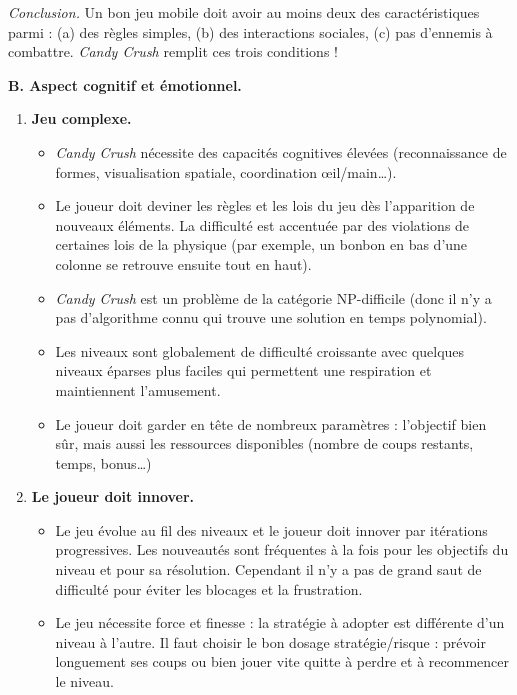 \documentclass[11pt,class=report,crop=false]{standalone}
\begin{document}
\emph{Conclusion.} 
Un bon jeu mobile doit avoir au moins deux des caractéristiques parmi : 
(a) des règles simples,
(b) des interactions sociales,
(c) pas d'ennemis à combattre.
\emph{Candy Crush} remplit ces trois conditions !

 
\bigskip

\textbf{B. Aspect cognitif et émotionnel.}

\begin{enumerate}
	\item \textbf{Jeu complexe.}	
	\begin{itemize}
		\item \emph{Candy Crush} nécessite des capacités cognitives élevées (reconnaissance de formes, visualisation spatiale, coordination \oe il/main\ldots). 
			
		\item Le joueur doit deviner les règles et les lois du jeu dès l'apparition de nouveaux éléments. La difficulté est accentuée par des violations de certaines lois de la physique (par exemple, un bonbon en bas d'une colonne se retrouve ensuite tout en haut).
		
		\item \emph{Candy Crush} est un problème de la catégorie NP-difficile (donc il n'y a pas d'algorithme connu qui trouve une solution en temps polynomial).
		
		\item Les niveaux sont globalement de difficulté croissante avec quelques niveaux éparses plus faciles qui permettent une respiration et maintiennent l'amusement.
		
		\item Le joueur doit garder en tête de nombreux paramètres : l'objectif bien sûr,  mais aussi les ressources disponibles (nombre de coups restants, temps, bonus\ldots)
	\end{itemize}
	
	\item \textbf{Le joueur doit innover.}	
	\begin{itemize}
		\item Le jeu évolue au fil des niveaux et le joueur doit innover par itérations progressives.
		Les nouveautés sont fréquentes à la fois pour les objectifs du  niveau et pour sa résolution. Cependant il n'y a pas de grand saut de difficulté pour éviter les blocages et la frustration.
		
		\item Le jeu nécessite force et finesse : la stratégie à adopter est différente d'un niveau à l'autre. Il faut choisir le bon dosage stratégie/risque : prévoir longuement ses coups ou bien jouer vite quitte à perdre et à recommencer le niveau.
				

\end{itemize}
\end{enumerate}
\end{document}
